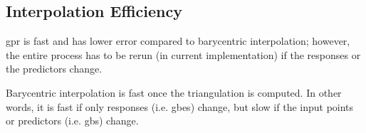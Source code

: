 \documentclass[preprint,12pt]{elsarticle}
\begin{document}
\begin{figure}
    \label{fig:brkerror}
\end{figure}

\subsection{Interpolation Efficiency}
\label{sec:results:efficiency}


\Gls{gpr} is fast and has lower error compared to barycentric interpolation; however, the entire process has to be rerun (in current implementation) if the responses or the predictors change.

Barycentric interpolation is fast once the triangulation is computed. In other words, it is fast if only responses (i.e. \glspl{gbe}) change, but slow if the input points or predictors (i.e. \glspl{gb}) change.
\end{document}

